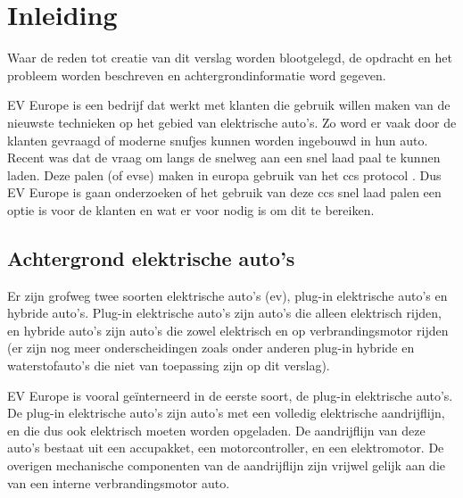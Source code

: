 \chapter{Inleiding}
\label{inleiding}

\begin{center}
    \begin{minipage}{0.5\textwidth}
        \begin{small}
            Waar de reden tot creatie van dit verslag worden blootgelegd, de
            opdracht en het probleem worden beschreven en achtergrondinformatie
            word gegeven.
        \end{small}
    \end{minipage}
    \vspace{0.5cm}
\end{center}

\noindent EV Europe is een bedrijf dat werkt met klanten die gebruik willen
maken van de nieuwste technieken op het gebied van elektrische auto's. Zo word
er vaak door de klanten gevraagd of moderne snufjes kunnen worden ingebouwd in
hun auto. Recent was dat de vraag om langs de snelweg aan een snel laad paal te
kunnen laden. Deze palen (of \ac{evse}) maken in europa gebruik van het \ac{ccs}
protocol \cite{Directive_2014/94/EU}. Dus EV Europe is gaan onderzoeken of het
gebruik van deze \ac{ccs} snel laad palen een optie is voor de klanten en wat er
voor nodig is om dit te bereiken.

\section{Achtergrond elektrische auto's}

Er zijn grofweg twee soorten elektrische auto's (\ac{ev}), plug-in elektrische
auto's en hybride auto's. Plug-in elektrische auto's zijn auto's die alleen
elektrisch rijden, en hybride auto's zijn auto's die zowel elektrisch en op
verbrandingsmotor rijden (er zijn nog meer onderscheidingen zoals onder anderen
plug-in hybride en waterstofauto's die niet van toepassing zijn op dit
verslag).

EV Europe is vooral geïnterneerd in de eerste soort, de plug-in elektrische
auto's. De plug-in elektrische auto's zijn auto's met een volledig elektrische
aandrijflijn, en die dus ook elektrisch moeten worden opgeladen. De
aandrijflijn van deze auto's bestaat uit een accupakket, een motorcontroller,
en een elektromotor. De overigen mechanische componenten van de aandrijflijn
zijn vrijwel gelijk aan die van een interne verbrandingsmotor auto.

